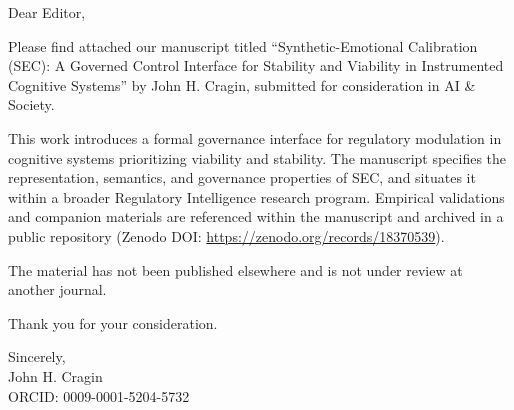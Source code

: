 \documentclass[12pt,a4paper]{letter}
\begin{document}
\begin{letter}{}
\address{John H. Cragin \\
Independent Researcher \\
ORCID: 0009-0001-5204-5732 \\
john.cragin@outlook.com}

\date{\today}

Dear Editor,

Please find attached our manuscript titled ``Synthetic-Emotional Calibration (SEC): A Governed Control Interface for Stability and Viability in Instrumented Cognitive Systems'' by John H. Cragin, submitted for consideration in AI \& Society.

This work introduces a formal governance interface for regulatory modulation in cognitive systems prioritizing viability and stability. The manuscript specifies the representation, semantics, and governance properties of SEC, and situates it within a broader Regulatory Intelligence research program. Empirical validations and companion materials are referenced within the manuscript and archived in a public repository (Zenodo DOI: \url{https://zenodo.org/records/18370539}).

The material has not been published elsewhere and is not under review at another journal.

Thank you for your consideration.

Sincerely, \\
John H. Cragin \\
ORCID: 0009-0001-5204-5732

\end{letter}
\end{document}
